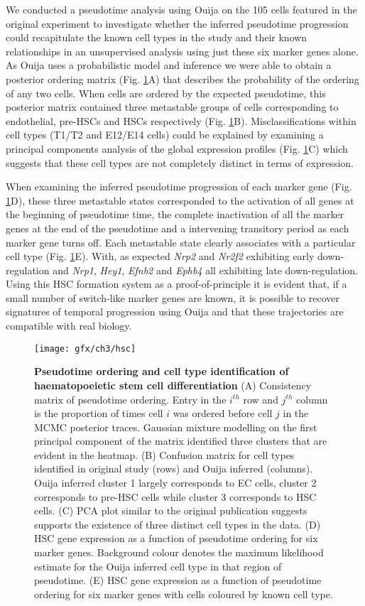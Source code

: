 We conducted a pseudotime analysis using Ouija on the 105 cells featured in the original experiment to investigate whether the inferred pseudotime progression could recapitulate the known cell types in the study and their known relationships in an unsupervised analysis using just these six marker genes alone. As Ouija uses a probabilistic model and inference we were able to obtain a posterior ordering matrix (Fig. \ref{fig:hsc}A) that describes the probability of the ordering of any two cells. When cells are ordered by the expected pseudotime, this posterior matrix contained three metastable groups of cells corresponding to endothelial, pre-HSCs and HSCs respectively (Fig. \ref{fig:hsc}B). Misclassifications within cell types (T1/T2 and E12/E14 cells) could be explained by examining a principal components analysis of the global expression profiles (Fig. \ref{fig:hsc}C) which suggests that these cell types are not completely distinct in terms of expression.

When examining the inferred pseudotime progression of each marker gene (Fig. \ref{fig:hsc}D), these three metastable states corresponded to the activation of all genes at the beginning of pseudotime time, the complete inactivation of all the marker genes at the end of the pseudotime and a intervening transitory period as each marker gene turns off. Each metastable state clearly associates with a particular cell type (Fig. \ref{fig:hsc}E). With, as expected \emph{Nrp2} and \emph{Nr2f2} exhibiting early down-regulation and \emph{Nrp1}, \emph{Hey1}, \emph{Efnb2} and \emph{Ephb4} all exhibiting late down-regulation. Using this HSC formation system as a proof-of-principle it is evident that, if a small number of switch-like marker genes are known, it is possible to recover signatures of temporal progression using Ouija and that these trajectories are compatible with real biology.

\begin{figure}
	\centering
	\texttt{[image: gfx/ch3/hsc]}
	\caption{{\bf Pseudotime ordering and cell type identification of haematopoeietic stem cell differentiation}
(A) Consistency matrix of pseudotime ordering. Entry in the $i^{th}$ row and $j^{th}$ column is the proportion of times cell $i$ was ordered before cell $j$ in the MCMC posterior traces. Gaussian mixture modelling on the first principal component of the matrix identified three clusters that are evident in the heatmap.
(B) Confusion matrix for cell types identified in original study (rows) and Ouija inferred (columns). Ouija inferred cluster 1 largely corresponds to EC cells, cluster 2 corresponds to pre-HSC cells while cluster 3 corresponds to HSC cells.
(C) PCA plot similar to the original publication \cite{zhou2016tracing} suggests supports the existence of three distinct cell types in the data.
(D) HSC gene expression as a function of pseudotime ordering for six marker genes. Background colour denotes the maximum likelihood estimate for the Ouija inferred cell type in that region of pseudotime.
(E) HSC gene expression as a function of pseudotime ordering for six marker genes with cells coloured by known cell type.
}
	\label{fig:hsc}
\end{figure}


